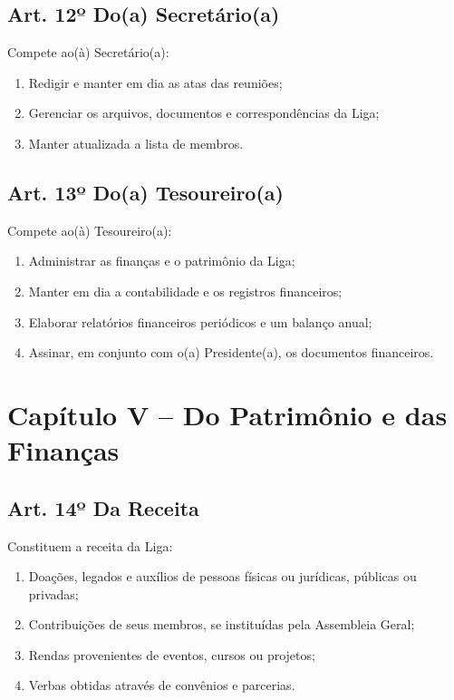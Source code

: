 \documentclass[12pt, a4paper]{article}
\begin{document}
\subsection{Art. 12º Do(a) Secretário(a)}
Compete ao(à) Secretário(a):
\begin{enumerate}[label=\alph*)]
    \item Redigir e manter em dia as atas das reuniões;
    \item Gerenciar os arquivos, documentos e correspondências da Liga;
    \item Manter atualizada a lista de membros.
\end{enumerate}

\subsection{Art. 13º Do(a) Tesoureiro(a)}
Compete ao(à) Tesoureiro(a):
\begin{enumerate}[label=\alph*)]
    \item Administrar as finanças e o patrimônio da Liga;
    \item Manter em dia a contabilidade e os registros financeiros;
    \item Elaborar relatórios financeiros periódicos e um balanço anual;
    \item Assinar, em conjunto com o(a) Presidente(a), os documentos financeiros.
\end{enumerate}


\section{Capítulo V – Do Patrimônio e das Finanças}


\subsection{Art. 14º Da Receita}
Constituem a receita da Liga:
\begin{enumerate}[label=\alph*)]
    \item Doações, legados e auxílios de pessoas físicas ou jurídicas, públicas ou privadas;
    \item Contribuições de seus membros, se instituídas pela Assembleia Geral;
    \item Rendas provenientes de eventos, cursos ou projetos;
    \item Verbas obtidas através de convênios e parcerias.
\end{enumerate}
\end{document}

